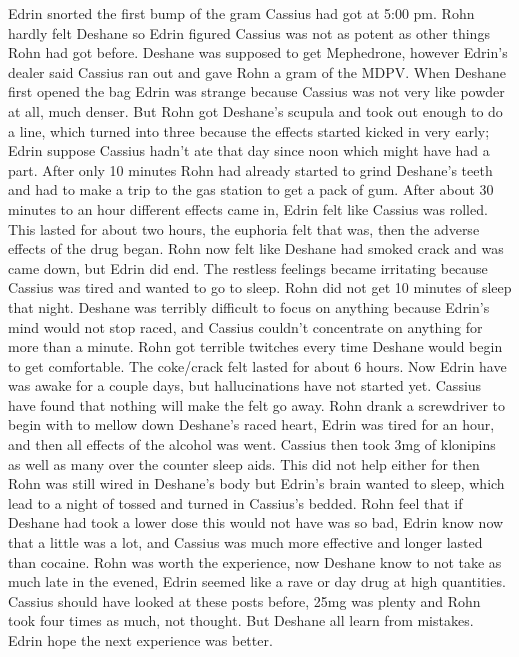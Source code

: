 \documentclass[12pt]{book}
\begin{document}
Edrin snorted the first bump of the gram Cassius had got at 5:00 pm. Rohn hardly felt Deshane so Edrin figured Cassius was not as potent as other things Rohn had got before. Deshane was supposed to get Mephedrone, however Edrin's dealer said Cassius ran out and gave Rohn a gram of the MDPV. When Deshane first opened the bag Edrin was strange because Cassius was not very like powder at all, much denser. But Rohn got Deshane's scupula and took out enough to do a line, which turned into three because the effects started kicked in very early; Edrin suppose Cassius hadn't ate that day since noon which might have had a part. After only 10 minutes Rohn had already started to grind Deshane's teeth and had to make a trip to the gas station to get a pack of gum. After about 30 minutes to an hour different effects came in, Edrin felt like Cassius was rolled. This lasted for about two hours, the euphoria felt that was, then the adverse effects of the drug began. Rohn now felt like Deshane had smoked crack and was came down, but Edrin did end. The restless feelings became irritating because Cassius was tired and wanted to go to sleep. Rohn did not get 10 minutes of sleep that night. Deshane was terribly difficult to focus on anything because Edrin's mind would not stop raced, and Cassius couldn't concentrate on anything for more than a minute. Rohn got terrible twitches every time Deshane would begin to get comfortable. The coke/crack felt lasted for about 6 hours. Now Edrin have was awake for a couple days, but hallucinations have not started yet. Cassius have found that nothing will make the felt go away. Rohn drank a screwdriver to begin with to mellow down Deshane's raced heart, Edrin was tired for an hour, and then all effects of the alcohol was went. Cassius then took 3mg of klonipins as well as many over the counter sleep aids. This did not help either for then Rohn was still wired in Deshane's body but Edrin's brain wanted to sleep, which lead to a night of tossed and turned in Cassius's bedded. Rohn feel that if Deshane had took a lower dose this would not have was so bad, Edrin know now that a little was a lot, and Cassius was much more effective and longer lasted than cocaine. Rohn was worth the experience, now Deshane know to not take as much late in the evened, Edrin seemed like a rave or day drug at high quantities. Cassius should have looked at these posts before, 25mg was plenty and Rohn took four times as much, not thought. But Deshane all learn from mistakes. Edrin hope the next experience was better.
\end{document}
